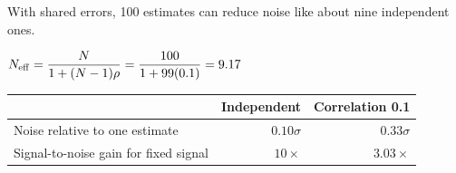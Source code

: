 \begin{frame}[t]{With shared errors, 100 estimates can reduce noise like about nine independent ones.\ev{\tagA}}
\begin{center}{\fontsize{21}{25}\selectfont
$N_{\rm eff}=\dfrac{N}{1+(N-1)\rho}=\dfrac{100}{1+99(0.1)}=9.17$
\par}\end{center}
\vspace{.12cm}
{\fontsize{12.5}{16}\selectfont\begin{tabularx}{\linewidth}{@{}Y r r@{}}
\toprule & \textbf{Independent} & \textbf{Correlation 0.1}\\\midrule
Noise relative to one estimate & $0.10\sigma$ & $0.33\sigma$\\[4pt]
Signal-to-noise gain for fixed signal & $10\times$ & $3.03\times$\\\bottomrule
\end{tabularx}\par}


\end{frame}
